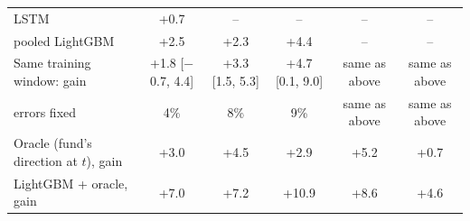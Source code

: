 \begin{table}[t]
\begin{tabular}{@{}lccccc@{}}
    \quad LSTM & +0.7 & -- & -- & -- & -- \\
    \quad pooled LightGBM & +2.5 & +2.3 & +4.4 & -- & -- \\
    \midrule
    Same training window: gain & +1.8 [\ensuremath{-}0.7, 4.4] & +3.3 [1.5, 5.3] & +4.7 [0.1, 9.0] & same as above & same as above \\
    \quad errors fixed & 4\% & 8\% & 9\% & same as above & same as above \\
    \midrule
    Oracle (fund's direction at $t$), gain & +3.0 & +4.5 & +2.9 & +5.2 & +0.7 \\
    LightGBM + oracle, gain & +7.0 & +7.2 & +10.9 & +8.6 & +4.6 \\
    \bottomrule
  \end{tabular}
\end{table}
